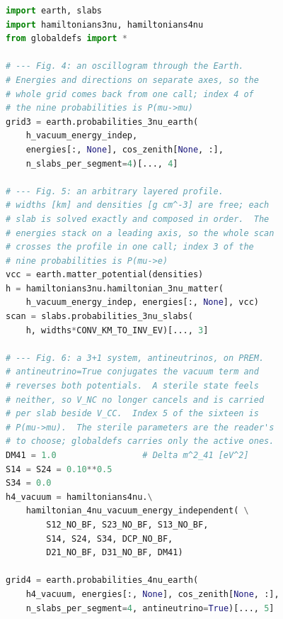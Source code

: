\documentclass[final,5p,times,twocolumn,sort,compress]{elsarticle}
\newcommand{\fig}{Fig.}
\newcommand{\figu}[1]{\fig~\ref{fig:#1}}
\begin{document}
\begin{lstlisting}[language=Python, caption={Producing Figures\ \ref{fig:earth_oscillogram}, \ref{fig:density_arrangement}, and \ref{fig:sterile_earth}.  Each snippet is the core of the calculation, with the geometry and the plotting left to the notebook \#10 of {\tt NuOscProbExact}.  The Earth routines take the energies and the directions on separate axes and return a whole oscillogram from one call, at three flavors and at four; the arbitrary profile of \figu{density_arrangement} is not one {\tt earth} knows about, so its slabs are composed directly, with the energies stacked the same way.  The slab counts here are the ones the figures were drawn at, not recommended defaults: Listing \ref{lst:tolerance} shows how to let the routines choose one from a tolerance.  Mixing angles are passed as sines, so a global fit quoting $\sin^2\theta$ needs a square root first.}, label={lst:figures}, float=t]
import earth, slabs
import hamiltonians3nu, hamiltonians4nu
from globaldefs import *

# --- Fig. 4: an oscillogram through the Earth.
# Energies and directions on separate axes, so the
# whole grid comes back from one call; index 4 of
# the nine probabilities is P(mu->mu)
grid3 = earth.probabilities_3nu_earth(
    h_vacuum_energy_indep,
    energies[:, None], cos_zenith[None, :],
    n_slabs_per_segment=4)[..., 4]

# --- Fig. 5: an arbitrary layered profile.
# widths [km] and densities [g cm^-3] are free; each
# slab is solved exactly and composed in order.  The
# energies stack on a leading axis, so the whole scan
# crosses the profile in one call; index 3 of the
# nine probabilities is P(mu->e)
vcc = earth.matter_potential(densities)
h = hamiltonians3nu.hamiltonian_3nu_matter(
    h_vacuum_energy_indep, energies[:, None], vcc)
scan = slabs.probabilities_3nu_slabs(
    h, widths*CONV_KM_TO_INV_EV)[..., 3]

# --- Fig. 6: a 3+1 system, antineutrinos, on PREM.
# antineutrino=True conjugates the vacuum term and
# reverses both potentials.  A sterile state feels
# neither, so V_NC no longer cancels and is carried
# per slab beside V_CC.  Index 5 of the sixteen is
# P(mu->mu).  The sterile parameters are the reader's
# to choose; globaldefs carries only the active ones. 
DM41 = 1.0                 # Delta m^2_41 [eV^2]
S14 = S24 = 0.10**0.5
S34 = 0.0
h4_vacuum = hamiltonians4nu.\
    hamiltonian_4nu_vacuum_energy_independent( \
        S12_NO_BF, S23_NO_BF, S13_NO_BF,
        S14, S24, S34, DCP_NO_BF,
        D21_NO_BF, D31_NO_BF, DM41)

grid4 = earth.probabilities_4nu_earth(
    h4_vacuum, energies[:, None], cos_zenith[None, :],
    n_slabs_per_segment=4, antineutrino=True)[..., 5]
\end{lstlisting}
\end{document}
